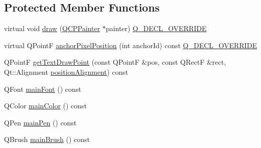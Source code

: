 \subsection*{Protected Member Functions}
\begin{DoxyCompactItemize}
\item 
virtual void \mbox{\hyperlink{class_q_c_p_item_text_a8f8f075da83b6547c2b32e1f64cf0554}{draw}} (\mbox{\hyperlink{class_q_c_p_painter}{Q\+C\+P\+Painter}} $\ast$painter) \mbox{\hyperlink{qcustomplot_8h_a42cc5eaeb25b85f8b52d2a4b94c56f55}{Q\+\_\+\+D\+E\+C\+L\+\_\+\+O\+V\+E\+R\+R\+I\+DE}}
\item 
virtual Q\+PointF \mbox{\hyperlink{class_q_c_p_item_text_afcdb1724d88d561f65da95fb54b0acb7}{anchor\+Pixel\+Position}} (int anchor\+Id) const \mbox{\hyperlink{qcustomplot_8h_a42cc5eaeb25b85f8b52d2a4b94c56f55}{Q\+\_\+\+D\+E\+C\+L\+\_\+\+O\+V\+E\+R\+R\+I\+DE}}
\item 
Q\+PointF \mbox{\hyperlink{class_q_c_p_item_text_a4c76ad7e33c50aff0a60b8f38fe6060e}{get\+Text\+Draw\+Point}} (const Q\+PointF \&pos, const Q\+RectF \&rect, Qt\+::\+Alignment \mbox{\hyperlink{class_q_c_p_item_text_a0d946dca3008d353afd04b4337739199}{position\+Alignment}}) const
\item 
Q\+Font \mbox{\hyperlink{class_q_c_p_item_text_af30ac2a0b84afa86a1dec22ab48dd07d}{main\+Font}} () const
\item 
Q\+Color \mbox{\hyperlink{class_q_c_p_item_text_abe3f10805baf62797cb91fd4a4464fcc}{main\+Color}} () const
\item 
Q\+Pen \mbox{\hyperlink{class_q_c_p_item_text_a2f67fcbb7ac10ea9a94c4ecc3b0f4dfc}{main\+Pen}} () const
\item 
Q\+Brush \mbox{\hyperlink{class_q_c_p_item_text_acddddd3ce88cfc87ab57b1ec4b25acb9}{main\+Brush}} () const
\end{DoxyCompactItemize}
